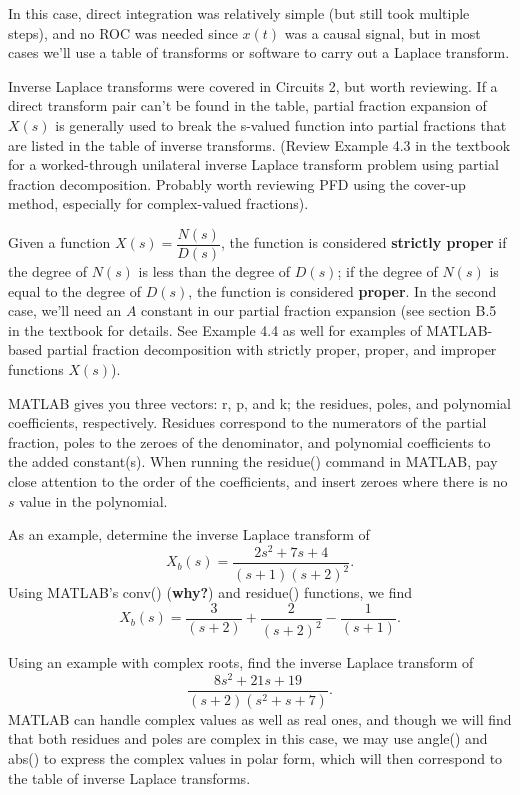 \documentclass{article}
\begin{document}
In this case, direct integration was relatively simple (but still took multiple steps), and no ROC was needed since \(x(t)\) was a causal signal, but in most cases we'll use a table of transforms or software to carry out a Laplace transform.

Inverse Laplace transforms were covered in Circuits 2, but worth reviewing. If a direct transform pair can't be found in the table, partial fraction expansion of \(X(s)\) is generally used to break the s-valued function into partial fractions that are listed in the table of inverse transforms. (Review Example 4.3 in the textbook for a worked-through unilateral inverse Laplace transform problem using partial fraction decomposition. Probably worth reviewing PFD using the cover-up method, especially for complex-valued fractions).

Given a function \(X(s) = \dfrac{N(s)}{D(s)}\), the function is considered \textbf{strictly proper} if the degree of \(N(s)\) is less than the degree of \(D(s)\); if the degree of \(N(s)\) is equal to the degree of \(D(s)\), the function is considered \textbf{proper}. In the second case, we'll need an \(A\) constant in our partial fraction expansion (see section B.5 in the textbook for details. See Example 4.4 as well for examples of MATLAB-based partial fraction decomposition with strictly proper, proper, and improper functions \(X(s)\)).

MATLAB gives you three vectors: r, p, and k; the residues, poles, and polynomial coefficients, respectively. Residues correspond to the numerators of the partial fraction, poles to the zeroes of the denominator, and polynomial coefficients to the added constant(s). When running the residue() command in MATLAB, pay close attention to the order of the coefficients, and insert zeroes where there is no \(s\) value in the polynomial.

As an example, determine the inverse Laplace transform of 
\[
  X_b(s) = \frac{2s^2 + 7s +4}{(s+1)(s+2)^2}.
\]
Using MATLAB's conv() (\textbf{why?}) and residue() functions, we find 
\[
  X_b(s) = \frac{3}{(s+2)} + \frac{2}{(s+2)^2} - \frac{1}{(s+1)}.
\]

Using an example with complex roots, find the inverse Laplace transform of
\[
  \frac{8s^2 + 21s + 19}{(s+2)(s^2 + s + 7)}.
\]
MATLAB can handle complex values as well as real ones, and though we will find that both residues and poles are complex in this case, we may use angle() and abs() to express the complex values in polar form, which will then correspond to the table of inverse Laplace transforms.
\end{document}
